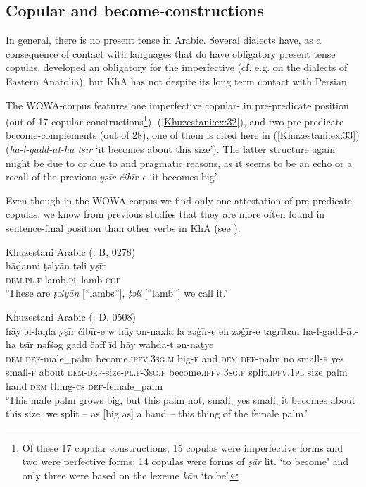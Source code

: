 \documentclass[output=paper,colorlinks,citecolor=brown,draftmode]{langscibook}
\begin{document}
\subsection{Copular and become-constructions}\label{Khuzestani:ss:2.12}

In general, there is no present tense  in Arabic. Several dialects have, as a consequence of contact with languages that do have obligatory present tense copulas, developed an obligatory  for the imperfective (cf. e.g. \citealt{prochazka2019} on the dialects of Eastern Anatolia), but KhA has not despite its long term contact with Persian. 

\begin{sloppypar}
The WOWA-corpus features one imperfective copular- in pre-predicate position (out of 17 copular constructions\footnote{Of these 17 copular constructions, 15 copulas were imperfective forms and two were perfective forms; 14 copulas were forms of \textit{ṣār} lit. `to become' and only three were based on the lexeme \textit{kān} `to be'.}), (\ref{Khuzestani:ex:32}), and two pre-predicate become-complements (out of 28), one of them is cited here in (\ref{Khuzestani:ex:33}) (\textit{ha-l-gadd-āt-ha tṣīr} `it becomes about this size'). The latter structure again might be due to  or due to  and pragmatic reasons, as it seems to be an echo or a recall of the previous \textit{yṣīr čibīr-e} `it becomes big'.
\end{sloppypar}

\begin{sloppypar}
Even though in the WOWA-corpus we find only one attestation of pre-predicate copulas, we know from previous studies that they are more often found in sentence-final position than other verbs in KhA (see \citealt{leitnerClause-final2022}). 
\end{sloppypar}

\ea\label{Khuzestani:ex:32}
Khuzestani Arabic (\citealt{leitnerArabic2021}: B, 0278) \\
\gll hāḏanni ṭəlyān ṭəli yṣīr \\
\textsc{dem.pl.f} lamb\textsc{.pl} lamb \textsc{cop} \\
\glt `These are \textit{ṭəlyān} [``lambs''], \textit{ṭəli} [``lamb''] we call it.'
\z

\ea\label{Khuzestani:ex:33}
Khuzestani Arabic (\citealt{leitnerArabic2021}: D, 0508) \\
\gll hāy əl-faḥla yṣīr čibīr-e w hāy ən-naxla la zəġīr-e eh zəġīr-e taġrīban ha-l-gadd-āt-ha tṣīr nəfšəg gadd čaff īd hāy waḥda-t ən-naṯye \\
\textsc{dem} \textsc{def-}male\_palm become\textsc{.ipfv.3sg.m} big\textsc{-f} and \textsc{dem} \textsc{def-}palm no small\textsc{-f} yes small\textsc{-f} about \textsc{dem-def-}size\textsc{-pl.f-3sg.f} become\textsc{.ipfv.3sg.f} split\textsc{.ipfv.1pl} size palm hand \textsc{dem} thing\textsc{-cs} \textsc{def}-female\_palm \\
\glt `This male palm grows big, but this palm not, small, yes small, it becomes about this size, we split – as [big as] a hand – this thing of the female palm.' 
\z
\end{document}
